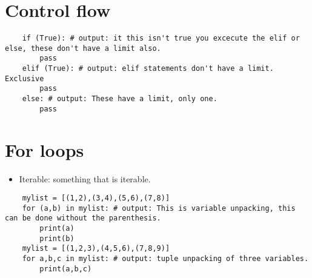 \section{Control flow}
\begin{verbatim}
    if (True): # output: it this isn't true you excecute the elif or else, these don't have a limit also. 
        pass 
    elif (True): # output: elif statements don't have a limit. Exclusive
        pass 
    else: # output: These have a limit, only one.
        pass 
\end{verbatim}
\section{For loops}
\begin{itemize}
    \item Iterable: something that is iterable. 
\end{itemize}
\begin{verbatim}
    mylist = [(1,2),(3,4),(5,6),(7,8)]
    for (a,b) in mylist: # output: This is variable unpacking, this can be done without the parenthesis. 
        print(a)
        print(b) 
    mylist = [(1,2,3),(4,5,6),(7,8,9)]
    for a,b,c in mylist: # output: tuple unpacking of three variables. 
        print(a,b,c)
\end{verbatim}

